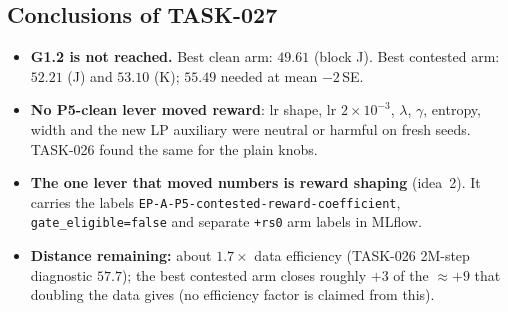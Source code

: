 \documentclass[10pt,a4paper]{article}
\newcommand{\p}[1]{\texttt{\small #1}}
\begin{document}
\subsection{Conclusions of TASK-027}
\begin{itemize}\itemsep1pt
\item \textbf{G1.2 is not reached.} Best clean arm: $49.61$ (block J). Best contested arm: $52.21$ (J) and $53.10$ (K); $55.49$ needed at mean $-2$\,SE.
\item \textbf{No P5-clean lever moved reward}: lr shape, lr $2\!\times\!10^{-3}$, $\lambda$, $\gamma$, entropy, width and the new LP auxiliary were neutral or harmful on fresh seeds. TASK-026 found the same for the plain knobs.
\item \textbf{The one lever that moved numbers is reward shaping} (idea~2). It carries the labels \p{EP-A-P5-contested-\allowbreak reward-coefficient}, \p{gate\_eligible=false} and separate \p{+rs0} arm labels in MLflow.
\item \textbf{Distance remaining:} about $1.7\times$ data efficiency (TASK-026 2M-step diagnostic $57.7$); the best contested arm closes roughly $+3$ of the $\approx+9$ that doubling the data gives (no efficiency factor is claimed from this).
\end{itemize}

\end{document}
